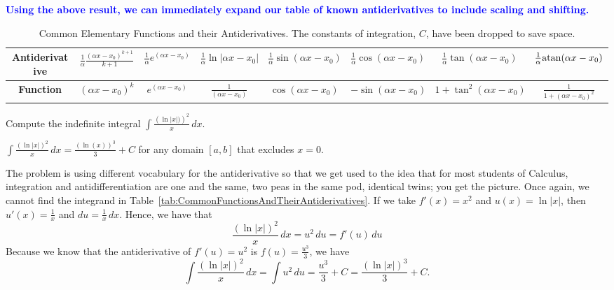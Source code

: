 \textcolor{blue}{\bf Using the above result, we can immediately expand our table of known antiderivatives to include scaling and shifting. }



\renewcommand{\arraystretch}{1.8}
\begin{table}[htb]
\centering
{\small %
\setlength\tabcolsep{3pt} %
\begin{tabular}{|c |c|c|c|c|c|c|c|}
\hline
{\bf Antiderivative} & $\frac{1}{\alpha} \frac{(\alpha x - x_0)^{k+1}}{k+1} $ & $\frac{1}{\alpha} e^{ (\alpha x - x_0)} $ & $\frac{1}{\alpha} \ln|\alpha x - x_0|$ & $\frac{1}{\alpha} \sin(\alpha x  - x_0 )$ & $\frac{1}{\alpha} \cos(\alpha x  - x_0 )$ & $\frac{1}{\alpha} \tan(\alpha x  - x_0 )$ & $\frac{1}{\alpha}\mathrm{atan}(\alpha x  - x_0 )$ \\
\hline
{\bf Function} &  $(\alpha x - x_0)^k$ & $e^{ (\alpha  x- x_0)}$ & $\frac{1}{(\alpha x - x_0)}$ & $\cos(\alpha x  - x_0 )$ & $-\sin(\alpha x  - x_0 )$ & $1 + \tan^2(\alpha x  - x_0 )$ & $\frac{1}{1 + (\alpha x  - x_0 )^2}$ \\
\hline
\end{tabular}
}
\caption{Common Elementary Functions and their Antiderivatives. The constants of integration, $C$, have been dropped to save space.}
\label{tab:CommonFunctionsAndTheirAntiderivativesWithScalingShift}
\end{table}


\bigskip

\begin{example} 
\label{ex:uSubstiutionExamp03}
Compute the indefinite integral \( \int \frac{\left( \ln|x|) \right)^2}{x} \, dx \). 
\end{example}

\solution \Ans \( \int \frac{\left( \ln|x| \right)^2}{x} \, dx = \frac{\left(\ln(x) \right)^3}{3} + C\) for any domain $[a, b]$ that excludes $x=0$.


The problem is using different vocabulary for the antiderivative so that we get used to the idea that for most students of Calculus, integration and antidifferentiation are one and the same, two peas in the same pod, identical twins; you get the picture. Once again, we cannot find the integrand in Table~\ref{tab:CommonFunctionsAndTheirAntiderivatives}. If we take $f'(x) = x^2$ and $u(x) = \ln|x|$, then $u'(x) = \frac{1}{x}$ and $du = \frac{1}{x} \, dx$. Hence, we have that 
$$ \frac{\left( \ln|x| \right)^2}{x} \, dx = u^2 \, du = f'(u) \, du$$
Because we know that the antiderivative of $f'(u)=u^2$ is $f(u)= \frac{u^3}{3}$, we have
$$ \int \frac{\left( \ln|x| \right)^2}{x} \, dx = \int u^2 \, du = \frac{u^3}{3} + C= \frac{\left(\ln|x| \right)^3}{3} + C.$$

